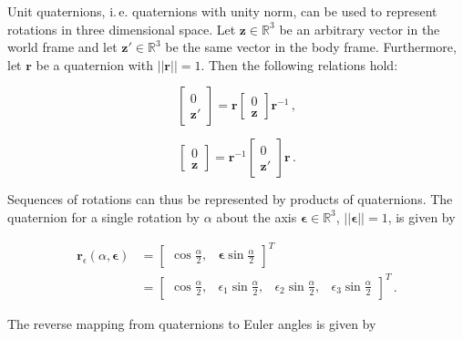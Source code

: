 Unit quaternions, i.\,e. quaternions with unity norm, can be used to represent rotations in three dimensional space. Let $\mathbf{z} \in \mathbb{R}^3$ be an arbitrary vector in the world frame and let $\mathbf{z}' \in \mathbb{R}^3$ be the same vector in the body frame. Furthermore, let $\mathbf{r}$ be a quaternion with $||\mathbf{r}|| = 1$. Then the following relations hold:

\begin{equation}
  \begin{bmatrix}
  	0 \\ \mathbf{z}' 
  \end{bmatrix} = \mathbf{r} \begin{bmatrix}
  	0 \\ \mathbf{z} 
  \end{bmatrix} \mathbf{r}^{-1}\,,
\end{equation}

\begin{equation}
  \begin{bmatrix}
  	0 \\ \mathbf{z} 
  \end{bmatrix} = \mathbf{r}^{-1} \begin{bmatrix}
  	0 \\ \mathbf{z}' 
  \end{bmatrix} \mathbf{r}\,.
\end{equation}

\noindent
Sequences of rotations can thus be represented by products of quaternions. The quaternion for a single rotation by $\alpha$ about the axis $\bm{\epsilon} \in \mathbb{R}^3$, $||\bm{\epsilon}|| = 1$, is given by

\begin{equation}
\begin{split}
  \mathbf{r}_{\epsilon}(\alpha, \bm{\epsilon}) &= \begin{bmatrix}
  	\cos \frac{\alpha}{2}, & \bm{\epsilon} \sin \frac{\alpha}{2}
  \end{bmatrix}^T \\
  &= \begin{bmatrix}
  	\cos \frac{\alpha}{2}, & \epsilon _1 \sin \frac{\alpha}{2}, & \epsilon _2 \sin \frac{\alpha}{2}, & \epsilon _3 \sin \frac{\alpha}{2}
  \end{bmatrix}^T\,.
\end{split}
\end{equation}

\noindent
The reverse mapping from quaternions to Euler angles is given by

